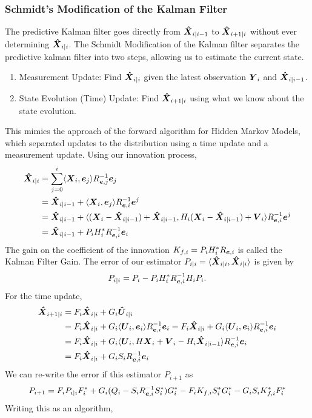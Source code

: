 \subsubsection{Schmidt's Modification of the Kalman Filter}
The predictive Kalman filter goes directly from $\boldsymbol{\hat{X}}_{i|i-1}$ to $\boldsymbol{\hat{X}}_{i+1|i}$ without ever determining $\boldsymbol{\hat{X}}_{i|i}$.
The Schmidt Modification of the Kalman filter separates the predictive kalman filter into two steps, allowing us to estimate the current state.
\begin{enumerate}
	\item Measurement Update: Find $\boldsymbol{\hat{X}}_{i|i}$ given the latest observation $\boldsymbol{Y}_{i}$ and $\boldsymbol{\hat{X}}_{i|i-1}$.
	\item State Evolution (Time) Update: Find $\boldsymbol{\hat{X}}_{i+1|i}$ using what we know about the state evolution.
\end{enumerate}
This mimics the approach of the forward algorithm for Hidden Markov Models, which separated updates to the distribution using a time update and a measurement update.
Using our innovation process,
\begin{align*}
	\boldsymbol{\hat{X}}_{i|i} &= \sum_{j=0}^i \langle \boldsymbol{X}_i, \boldsymbol{e}_j \rangle R_{\boldsymbol{e},j}^{-1}\boldsymbol{e}_j \\
	&= \boldsymbol{\hat{X}}_{i|i-1} + \langle \boldsymbol{X}_i, \boldsymbol{e}_j \rangle R_{\boldsymbol{e},i}^{-1}\boldsymbol{e}^j\\
	&= \boldsymbol{\hat{X}}_{i|i-1} + \langle (\boldsymbol{X}_i - \boldsymbol{\hat{X}}_{i|i-1}) + \boldsymbol{\hat{X}}_{i|i-1}, H_i(\boldsymbol{X}_i - \boldsymbol{\hat{X}}_{i|i-1}) + \boldsymbol{V}_i \rangle R_{\boldsymbol{e},i}^{-1}\boldsymbol{e}^j\\
	&= \boldsymbol{\hat{X}}_{i|i-1} + P_iH_i^*R_{\boldsymbol{e},i}^{-1}\boldsymbol{e}_i
\end{align*}
The gain on the coefficient of the innovation $K_{f,i}=P_iH_i^*R_{\boldsymbol{e},i}$ is called the Kalman Filter Gain.
The error of our estimator $P_{i|i} = \langle \boldsymbol{\hat{X}}_{i|i}, \boldsymbol{\hat{X}}_{i|i} \rangle$ is given by \[
	P_{i|i} = P_i - P_iH_i^*R_{\boldsymbol{e},i}^{-1}H_iP_i.
\]
For the time update,
\begin{align*}
	\boldsymbol{\hat{X}}_{i+1|i} &= F_i\boldsymbol{\hat{X}}_{i|i} + G_i\boldsymbol{\hat{U}}_{i|i} \\
	&= F_i\boldsymbol{\hat{X}}_{i|i} + G_i\langle \boldsymbol{U}_i, \boldsymbol{e}_i \rangle R_{\boldsymbol{e},i}^{-1}\boldsymbol{e}_i = F_i\boldsymbol{\hat{X}}_{i|i} + G_i\langle \boldsymbol{U}_i, \boldsymbol{e}_i \rangle R_{\boldsymbol{e},i}^{-1}\boldsymbol{e}_i\\
	&= F_i\boldsymbol{\hat{X}}_{i|i} + G_i\langle \boldsymbol{U}_i, H\boldsymbol{X}_i+\boldsymbol{V}_i - H_i\boldsymbol{\hat{X}}_{i|i-1} \rangle R_{\boldsymbol{e},i}^{-1}\boldsymbol{e}_i\\
	&= F_i\boldsymbol{\hat{X}}_{i|i} + G_iS_iR_{\boldsymbol{e},i}^{-1}\boldsymbol{e}_i
\end{align*}
We can re-write the error if this estimator $P_{i+1}$ as \[
	P_{i+1} = F_iP_{i|i}F_i^* + G_i(Q_i - S_iR_{\boldsymbol{e},i}^{-1}S_i^*)G_i^* - F_iK_{f,i}S_i^*G_i^* - G_iS_iK_{f,i}^*F_i^*
\]
Writing this as an algorithm,

